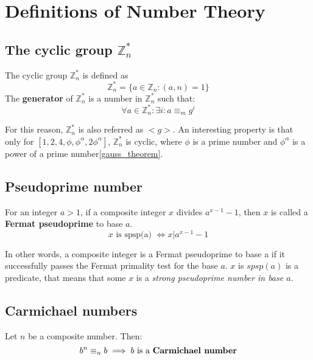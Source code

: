 \section{Definitions of Number Theory}
\subsection{The cyclic group $\mathbb{Z}_{n}^{*}$}
\begin{definition}
    The cyclic group $\mathbb{Z}_{n}^{*}$ is defined as
    \[
    \mathbb{Z}_{n}^{*} = \{a \in \mathbb{Z}_{n}: (a,n) = 1\}
    \]
    The \textbf{generator} of $\mathbb{Z}_{n}^{*}$ is a number in $\mathbb{Z}_{n}^{*}$ such that:
    \[
    \forall a \in \mathbb{Z}_{n}^{*}: \exists i: a \equiv_{m} g^{i}
    \]
\end{definition}
For this reason, $\mathbb{Z}_{n}^{*}$ is also referred as $< g >$.\newline
An interesting property is that only for $[1,2,4, \phi, \phi^{\alpha}, 2 \phi^{\alpha}]$, $\mathbb{Z}_{n}^{*}$ is cyclic, where $\phi$ is a prime number and $\phi^{\alpha}$ is a power of a prime number\ref{gauss_theorem}.

\subsection{Pseudoprime number}
\begin{definition}
    For an integer $a > 1$, if a composite integer $x$ divides $a^{x-1} - 1$, then $x$ is called a \textbf{Fermat pseudoprime} to base $a$.
    \[
    x \text{ is spsp(a) } \iff x|a^{x - 1} - 1
    \]
\end{definition}
In other words, a composite integer is a Fermat pseudoprime to base a if it successfully passes the Fermat primality test for the base $a$.\newline
$x$ is $spsp(a)$ is a predicate, that means that some $x$ is a \emph{strong pseudoprime number in base $a$}.

\subsection{Carmichael numbers}
\begin{definition}
    Let $n$ be a composite number. Then:
    \[b^{n} \equiv_{n} b \implies b \text{ is a \textbf{Carmichael number}}\]
\end{definition}

